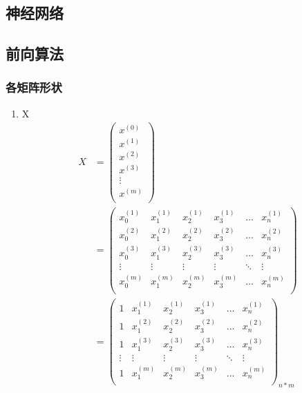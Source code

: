 \subsection{神经网络}
	

\subsection{前向算法}
\subsubsection{各矩阵形状}
\begin{enumerate}

\item X
\begin{equation} \begin{aligned}
	X & = \left(\begin{matrix}
			x^{(0)} \\ x^{(1)} \\ x^{(2)} \\ x^{(3)} \\ \vdots \\ x^{(m)} \\
		\end{matrix}\right) \\
	& = \left( \begin{matrix}
			x_0^{(1)} & x_1^{(1)} & x_2^{(1)} & x_3^{(1)} & \dots & x_n^{(1)} \\
			x_0^{(2)} & x_1^{(2)} & x_2^{(2)} & x_3^{(2)} & \dots & x_n^{(2)} \\
			x_0^{(3)} & x_1^{(3)} & x_2^{(3)} & x_3^{(3)} & \dots & x_n^{(3)} \\
			\vdots    & \vdots    & \vdots    & \vdots    & \ddots & \vdots   \\
			x_0^{(m)} & x_1^{(m)} & x_2^{(m)} & x_3^{(m)} & \dots & x_n^{(m)} \\
			\end{matrix}\right) \\
	& = \left(\begin{matrix}
			1 & x_1^{(1)} & x_2^{(1)} & x_3^{(1)} & \dots & x_n^{(1)} \\
			1 & x_1^{(2)} & x_2^{(2)} & x_3^{(2)} & \dots & x_n^{(2)} \\
			1 & x_1^{(3)} & x_2^{(3)} & x_3^{(3)} & \dots & x_n^{(3)} \\
			\vdots    & \vdots    & \vdots    & \vdots    & \ddots & \vdots   \\
			1 & x_1^{(m)} & x_2^{(m)} & x_3^{(m)} & \dots & x_n^{(m)} \\
		\end{matrix}\right)_{n*m}
\end{aligned} \end{equation}


\end{enumerate}
